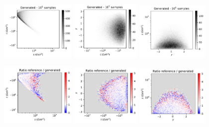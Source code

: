 \documentclass[twocolumn,preprintnumbers,superscriptaddress]{revtex4-2}
\begin{document}
\begin{figure}
  \includegraphics[width=0.32\textwidth]{plots/LHCttbar/s-t_FAKE_100k.pdf}%
  \includegraphics[width=0.3\textwidth]{plots/LHCttbar/t-y_FAKE_100k.pdf}%
  \includegraphics[width=0.31\textwidth]{plots/LHCttbar/y-s_FAKE_100k.pdf}

  \includegraphics[width=0.32\textwidth]{plots/LHCttbar/s-t_RATIO_100k.pdf}%
  \includegraphics[width=0.3\textwidth]{plots/LHCttbar/t-y_RATIO_100k.pdf}%
  \includegraphics[width=0.31\textwidth]{plots/LHCttbar/y-s_RATIO_100k.pdf}


\end{figure}
\end{document}
